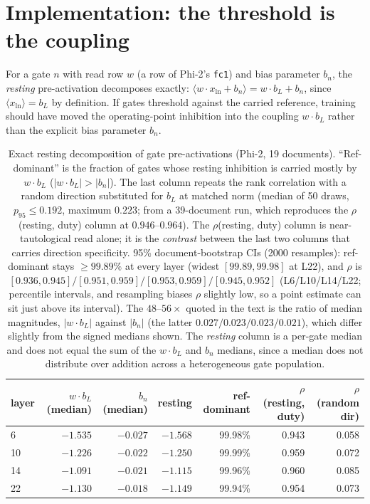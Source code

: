 \documentclass[11pt]{article}
\newcommand{\bl}{b_L}
\begin{document}
\section{Implementation: the threshold is the coupling}
\label{sec:bias}

For a gate $n$ with read row $w$ (a row of Phi-2's \texttt{fc1}) and
bias parameter $b_n$, the \emph{resting} pre-activation decomposes
exactly:
$\langle w\cdot x_{\text{ln}} + b_n \rangle = w\cdot\bl + b_n$, since
$\langle x_{\text{ln}} \rangle = \bl$ by definition. If gates
threshold against the carried reference, training should have moved
the operating-point inhibition into the coupling $w\cdot\bl$ rather
than the explicit bias parameter $b_n$.

\begin{table}[t]
\centering
\small
\begin{tabular}{lrrrrrr}
\toprule
layer & $w\cdot\bl$ (median) & $b_n$ (median) & resting &
ref-dominant & $\rho$(resting, duty) & $\rho$(random dir) \\
\midrule
6 & $-1.535$ & $-0.027$ & $-1.568$ & 99.98\% & 0.943 & 0.058 \\
10 & $-1.226$ & $-0.022$ & $-1.250$ & 99.99\% & 0.959 & 0.072 \\
14 & $-1.091$ & $-0.021$ & $-1.115$ & 99.96\% & 0.960 & 0.085 \\
22 & $-1.130$ & $-0.018$ & $-1.149$ & 99.94\% & 0.954 & 0.073 \\
\bottomrule
\end{tabular}
\caption{Exact resting decomposition of gate pre-activations (Phi-2,
19 documents). ``Ref-dominant'' is the fraction of gates whose resting
inhibition is carried mostly by $w\cdot\bl$ ($|w\cdot\bl| > |b_n|$). The last column repeats
the rank correlation with a random direction substituted for $\bl$ at
matched norm (median of 50 draws, $p_{95} \leq 0.192$, maximum
$0.223$; from a 39-document run, which reproduces the
$\rho$(resting, duty) column at $0.946$--$0.964$). The
$\rho$(resting, duty) column is near-tautological read alone; it is
the \emph{contrast} between the last two columns that carries
direction specificity. 95\% document-bootstrap
CIs (2000 resamples): ref-dominant stays $\geq 99.89\%$ at every layer
(widest $[99.89,99.98]$ at L22), and $\rho$ is
$[0.936,0.945]/[0.951,0.959]/[0.953,0.959]/[0.945,0.952]$
(L6/L10/L14/L22; percentile intervals, and resampling biases $\rho$
slightly low, so a point estimate can sit just above its interval). The
$48$--$56\times$ quoted in the text is the ratio of median magnitudes,
$|w\cdot\bl|$ against $|b_n|$ (the latter $0.027 / 0.023 / 0.023 /
0.021$), which differ slightly from the signed medians shown. The
\emph{resting} column is a per-gate median and
does not equal the sum of the $w\cdot\bl$ and $b_n$ medians, since a
median does not distribute over addition across a heterogeneous gate
population.}
\label{tab:bias}
\end{table}
\end{document}
